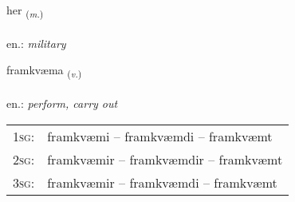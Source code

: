 \documentclass[frontgrid, backgrid]{flacards}\usepackage[]{graphicx}\usepackage[]{xcolor}
\begin{document}
\renewcommand{\flhead}{\vskip5pt \fboxsep=0pt {\small\bfseries\footnotesize Nafnorð | Noun}}
\renewcommand{\fcfoot}{\vskip5pt \fboxsep=0pt \hspace{2pt}{\small\bfseries\footnotesize 2K}}

\renewcommand{\blhead}{\vskip5pt {\small\bfseries\footnotesize Nafnorð | Noun }}
\renewcommand{\bcfoot}{\vskip5pt \hspace{2pt}{\small\bfseries\footnotesize 2K}}


{her \small{\textsubscript{(\textit{m.})}} \\[1ex] %
\textphonetic{[hɛːr]} \\
en.: \emph{military} \\  [2ex]
\renewcommand*{\arraystretch}{0.8}
}

\renewcommand{\flhead}{\vskip5pt \fboxsep=0pt {\small\bfseries\footnotesize Sagnorð | Verb}}
\renewcommand{\fcfoot}{\vskip5pt \fboxsep=0pt \hspace{2pt}{\small\bfseries\footnotesize 2K}}

\renewcommand{\blhead}{\vskip5pt {\small\bfseries\footnotesize Sagnorð | Verb }}
\renewcommand{\bcfoot}{\vskip5pt \hspace{2pt}{\small\bfseries\footnotesize 2K}}


{framkvæma \small{\textsubscript{(\textit{v.})}} \\[1ex] %
\textphonetic{[framkʰvaima]} \\
en.: \emph{perform, carry out} \\  [2ex]
\renewcommand*{\arraystretch}{0.8}
\begin{tabular}{p{1cm}l}
\textsc{1sg}: & framkvæmi -- framkvæmdi -- framkvæmt \\ 
\textsc{2sg}: & framkvæmir -- framkvæmdir -- framkvæmt \\ 
\textsc{3sg}: & framkvæmir -- framkvæmdi -- framkvæmt \\ 
\end{tabular}
}
\end{document}
